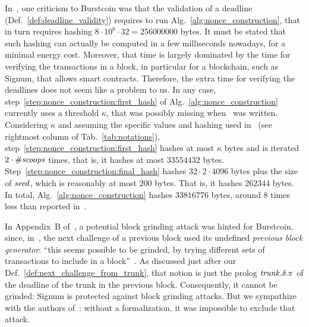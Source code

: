 In~\cite{ParkKFGAP18}, one criticism to Burstcoin was that the validation of a deadline
(Def.~\ref{def:deadline_validity}) requires to run
Alg.~\ref{alg:nonce_construction}, that in turn
requires hashing $8\cdot 10^6\cdot 32=256000000$ bytes.
It must be stated that
such hashing can actually be computed in a few milliseconds nowadays,
for a minimal energy cost. Moreover, that time is largely dominated
by the time for verifying the transactions in a block, in particular
for a blockchain, such as Signum, that allows smart contracts.
Therefore, the extra time for verifying the deadlines does not seem like a problem to us.
In any case, step~\ref{step:nonce_construction:first_hash} of
Alg.~\ref{alg:nonce_construction} currently uses a threshold $\kappa$,
that was possibly missing when~\cite{ParkKFGAP18} was written.
Considering $\kappa$ and assuming the specific values and hashing
used in~\cite{SignumPlotting} (see rightmost column of Tab.~\ref{tab:notations}),
step~\ref{step:nonce_construction:first_hash}
hashes at most $\kappa$ bytes and is iterated $2\cdot{\#\mathit{scoops}}$ times, that is,
it hashes at most $33554432$ bytes.
Step~\ref{step:nonce_construction:final_hash} hashes $32\cdot 2\cdot 4096$ bytes
plus the size of ${\mathit{seed}}$, which is reasonably at most $200$ bytes.
That is, it hashes $262344$ bytes. In total, Alg.~\ref{alg:nonce_construction}
hashes $33816776$ bytes, around $8$ times less than reported in~\cite{ParkKFGAP18}.

In Appendix~B of~\cite{ParkKFGAP18}, a potential block grinding attack was hinted for Burstcoin,
since, in~\cite{SignumPlotting}, the next challenge of a previous block used its undefined
\emph{previous block generator}:
``this seems possible to be grinded, by trying
different sets of transactions to include in a block''~\cite{ParkKFGAP18}.
As discussed just after our Def.~\ref{def:next_challenge_from_trunk}, that notion is
just the prolog ${\mathit{trunk}}.\delta.\pi$ of the deadline of the trunk in the previous block.
Consequently, it cannot be grinded: Signum is protected against block grinding attacks.
But we sympathize with the authors of~\cite{ParkKFGAP18}: without a formalization,
it was impossible to exclude that attack.

